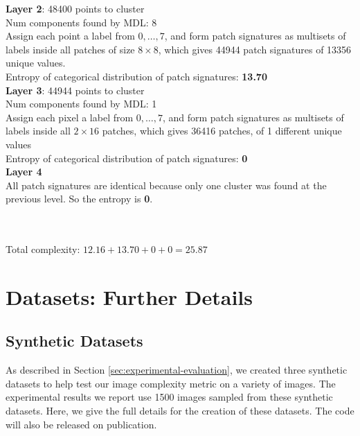 \documentclass[a4paper,fleqn]{cas-sc}
\theoremstyle{remark}
\begin{document}
\noindent \textbf{Layer 2}: 48400 points to cluster \\
Num components found by MDL: 8 \\
Assign each point a label from $0, \dots, 7$, and form patch signatures as multisets of labels inside all patches of size $8 \times 8$, which gives 44944 patch signatures of 13356 unique values. \\
Entropy of categorical distribution of patch signatures: \textbf{13.70} \\

\noindent \textbf{Layer 3}: 44944 points to cluster \\
Num components found by MDL: 1 \\
Assign each pixel a label from $0, \dots, 7$, and form patch signatures as multisets of labels inside all $2 \times 16$ patches, which gives 36416 patches, of 1 different unique values \\
Entropy of categorical distribution of patch signatures: \textbf{0} \\

\noindent \textbf{Layer 4} \\
All patch signatures are identical because only one cluster was found at the previous level. So the entropy is \textbf{0}.
\begin{large}
\\
\\
Total complexity: $12.16 + 13.70 + 0 + 0 = \boldsymbol{25.87}$
\end{large}
\clearpage



\section{Datasets: Further Details}
\subsection{Synthetic Datasets}
As described in Section \ref{sec:experimental-evaluation}, we created three synthetic datasets to help test our image complexity metric on a variety of images. The experimental results we report use 1500 images sampled from these synthetic datasets. Here, we give the full details for the creation of these datasets. The code will also be released on publication.
\end{document}
